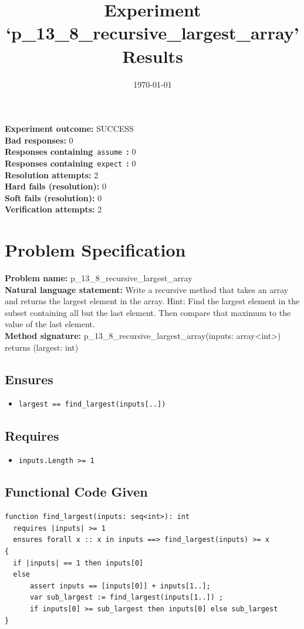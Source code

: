 \documentclass{article}
\begin{document}
\title{Experiment `p\_13\_8\_recursive\_largest\_array' Results}
\author{\today}
\date{}
\maketitle
\textbf{Experiment outcome: }SUCCESS
\\\textbf{Bad responses: }0
\\\textbf{Responses containing}~\texttt{assume}~\textbf{: }0
\\\textbf{Responses containing}~\texttt{expect}~\textbf{: }0
\\\textbf{Resolution attempts: }2
\\\textbf{Hard fails (resolution): }0
\\\textbf{Soft fails (resolution): }0
\\\textbf{Verification attempts: }2
\section*{Problem Specification}
\textbf{Problem name: }p\_13\_8\_recursive\_largest\_array
\\\textbf{Natural language statement: }Write a recursive method that takes an array and returns the largest element in the array. Hint: Find the largest element in the subset containing all but the last element. Then compare that maximum to the value of the last element.
\\\textbf{Method signature: }p\_13\_8\_recursive\_largest\_array(inputs: array<int>) returns (largest: int)
\subsection*{Ensures}
\begin{itemize}
\item \texttt{largest == find\_largest(inputs[..])}
\end{itemize}
\subsection*{Requires}
\begin{itemize}
\item \texttt{inputs.Length >= 1}
\end{itemize}
\subsection*{Functional Code Given}
\begin{lstlisting}
function find_largest(inputs: seq<int>): int
  requires |inputs| >= 1
  ensures forall x :: x in inputs ==> find_largest(inputs) >= x
{
  if |inputs| == 1 then inputs[0]
  else 
      assert inputs == [inputs[0]] + inputs[1..];
      var sub_largest := find_largest(inputs[1..]) ;
      if inputs[0] >= sub_largest then inputs[0] else sub_largest
}
\end{lstlisting}
\clearpage
\end{document}
